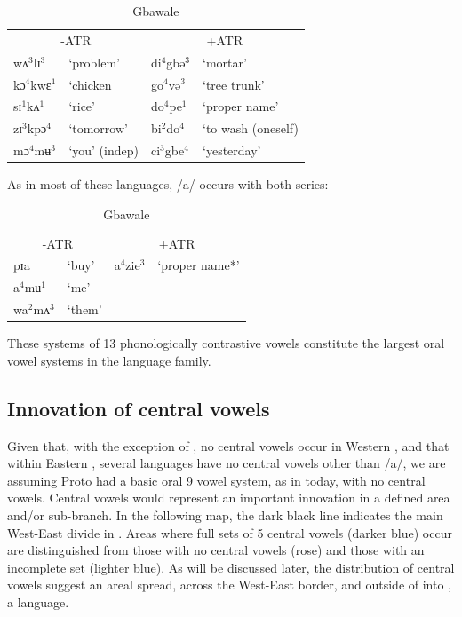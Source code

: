 \documentclass[output=paper
,newtxmath
,modfonts
,nonflat]{langsci/langscibook}
\begin{document}
\begin{table}
    \label{tab:zogbo:9}
    \caption{Gbawale \citep{Seri1987}}
\begin{tabular}{llll}
\multicolumn{2}{c}{-ATR} & \multicolumn{2}{c}{+ATR}\\

wʌ$^3$lɪ$^3$  &  ‘problem’  &     di$^4$gbə$^3$ & ‘mortar’ \\

kɔ$^4$kwɛ$^1$ & ‘chicken &      go$^4$və$^3$ &  ‘tree trunk’\\

sɪ$^1$kʌ$^1$ & ‘rice’  &       do$^4$pe$^1$ &  ‘proper name’ \\ 

zɪ$^3$kpɔ$^4$ & ‘tomorrow’   &    bi$^2$do$^4$ &  ‘to wash (oneself)\\

mɔ$^4$mʉ$^3$ & ‘you’ (indep)   &   ci$^3$gbe$^4$ & ‘yesterday’\\

\end{tabular}
\end{table}

As in most of these languages, /a/ occurs with both series: 


\begin{table}
\label{ex:zogbo:10}
\caption{Gbawale \citep{Seri1987}}
\begin{tabular}{llll}
\multicolumn{2}{c}{-ATR} & \multicolumn{2}{c}{+ATR}\\

pɪa  &  ‘buy’    &  a$^4$zie$^3$ &   ‘proper name*’\\ 

a$^4$mʉ$^1$  &  ‘me’ \\

wa$^2$mʌ$^3$ & ‘them’ \\
\end{tabular}
\end{table}

These systems of 13 phonologically contrastive vowels constitute the largest oral vowel systems in the  language family.  

\subsection{Innovation of central vowels}\label{sec:zogbo:2.1} 

Given that, with the exception of , no central vowels occur in Western , and that within Eastern , several languages have no central vowels other than /a/, we are assuming Proto  had a basic oral 9 vowel system, as in  today, with no central vowels.  Central vowels would represent an important innovation in a defined area and/or sub-branch.  In the following map, the dark black line indicates the main West-East divide in .  Areas where full sets of 5 central vowels (darker blue) occur are distinguished from those with no central vowels (rose) and those with an incomplete set (lighter blue). As will be discussed later, the distribution of central vowels suggest an areal spread, across the West-East border, and outside of  into , a  language.
\end{document}
